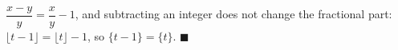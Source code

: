 $\dfrac{x-y}y=\dfrac xy-1$, and subtracting an integer does not change the fractional part: $\lfloor t-1\rfloor=\lfloor t\rfloor-1$, so $\{t-1\}=\{t\}$. $\blacksquare$
